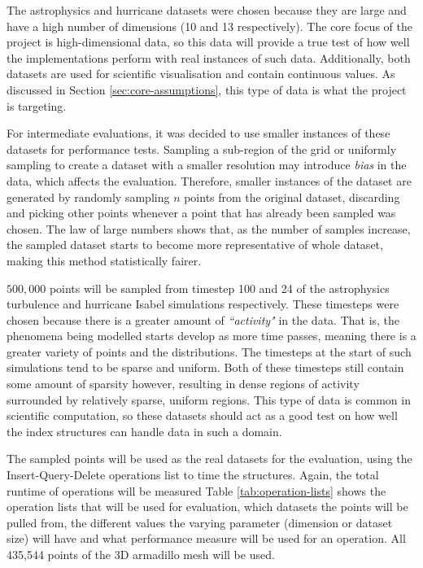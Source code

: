 The astrophysics and hurricane datasets were chosen because they are large and have a high number of dimensions (10 and 13 respectively). The core focus of the project is high-dimensional data, so this data will provide a true test of how well the implementations perform with real instances of such data. Additionally, both datasets are used for scientific visualisation and contain continuous values. As discussed in Section \ref{sec:core-assumptions}, this type of data is what the project is targeting.

For intermediate evaluations, it was decided to use smaller instances of these datasets for performance tests. Sampling a sub-region of the grid or uniformly sampling to create a dataset with a smaller resolution may introduce \textit{bias} in the data, which affects the evaluation. Therefore, smaller instances of the dataset are generated by randomly sampling $n$ points from the original dataset, discarding and picking other points whenever a point that has already been sampled was chosen. The law of large numbers \cite{large-sample-theory} shows that, as the number of samples increase, the sampled dataset starts to become more representative of whole dataset, making this method statistically fairer.

$500,000$ points will be sampled from timestep 100 and 24 of the astrophysics turbulence and hurricane Isabel simulations respectively. These timesteps were chosen because there is a greater amount of \textit{``activity"} in the data. That is, the phenomena being modelled starts develop as more time passes, meaning there is a greater variety of points and the distributions. The timesteps at the start of such simulations tend to be sparse and uniform. Both of these timesteps still contain some amount of sparsity however, resulting in dense regions of activity surrounded by relatively sparse, uniform regions. This type of data is common in scientific computation, so these datasets should act as a good test on how well the index structures can handle data in such a domain.

The sampled points will be used as the real datasets for the evaluation, using the Insert-Query-Delete operations list to time the structures. Again, the total runtime of operations will be measured Table \ref{tab:operation-lists} shows the operation lists that will be used for evaluation, which datasets the points will be pulled from, the different values the varying parameter (dimension or dataset size) will have and what performance measure will be used for an operation. All 435,544 points of the 3D armadillo mesh will be used.

